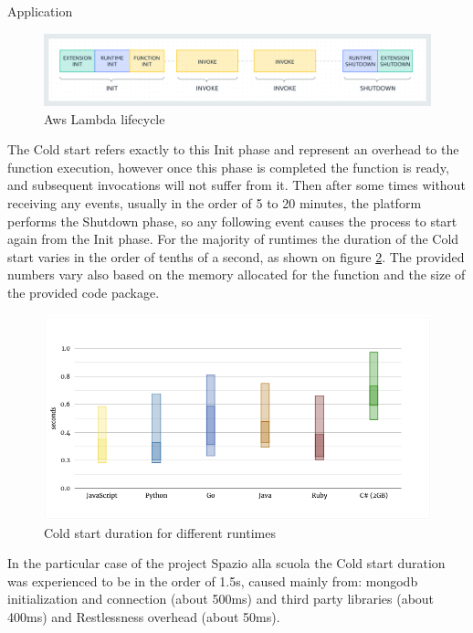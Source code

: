 \begin{chapter}{Application}
    \begin{figure}
        \centering
        \includegraphics[width=\linewidth]{source/images/aws-lambda-lifecycle.png}
        \caption{Aws Lambda lifecycle}
        \label{fig:aws_lambda_lifecycle}
    \end{figure}

    The Cold start refers exactly to this Init phase and represent an overhead to the
    function execution, however once this phase is completed the function is ready,
    and subsequent invocations will not suffer from it. Then after some times without
    receiving any events, usually in the order of 5 to 20 minutes, the platform performs
    the Shutdown phase, so any following event causes the process to start again from
    the Init phase.
    For the majority of runtimes the duration of the Cold start varies in the order
    of tenths of a second, as shown on figure \ref{fig:cold_start_duration}. The provided
    numbers vary also based on the memory allocated for the function and the size of the
    provided code package.

    \begin{figure}
        \centering
        \includegraphics[width=\linewidth]{source/images/cold-start-duration.png}
        \caption{Cold start duration for different runtimes}
        \label{fig:cold_start_duration}
    \end{figure}

    In the particular case of the project Spazio alla scuola the Cold start duration
    was experienced to be in the order of 1.5s, caused mainly from: mongodb
    initialization and connection (about 500ms) and third party libraries (about 400ms)
    and Restlessness overhead (about 50ms).


\end{chapter}

